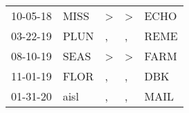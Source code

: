 \begin{supertabular}{p{0.07\textwidth}p{0.06\textwidth}p{0.02\textwidth}p{0.02\textwidth}p{0.06\textwidth}}
 10-05-18\textsuperscript{} &           MISS\textsuperscript{} &     \textgreater &  \textgreater &           ECHO\textsuperscript{} \\
 03-22-19\textsuperscript{} &           PLUN\textsuperscript{} &                , &             , &           REME\textsuperscript{} \\
 08-10-19\textsuperscript{} &           SEAS\textsuperscript{} &     \textgreater &  \textgreater &           FARM\textsuperscript{} \\
 11-01-19\textsuperscript{} &           FLOR\textsuperscript{} &                , &             , &            DBK\textsuperscript{} \\
 01-31-20\textsuperscript{} &           aisl\textsuperscript{} &                , &             , &           MAIL\textsuperscript{} \\
\end{supertabular}
